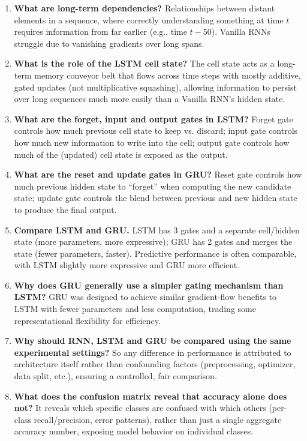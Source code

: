 \documentclass[10pt]{article}
\begin{document}
\begin{enumerate}
\item \textbf{What are long-term dependencies?}
Relationships between distant elements in a sequence, where correctly understanding something at time $t$ 
requires information from far earlier (e.g., time $t-50$). Vanilla RNNs struggle due to vanishing gradients 
over long spans.

\item \textbf{What is the role of the LSTM cell state?}
The cell state acts as a long-term memory conveyor belt that flows across time steps with mostly additive, 
gated updates (not multiplicative squashing), allowing information to persist over long sequences much more 
easily than a Vanilla RNN's hidden state.

\item \textbf{What are the forget, input and output gates in LSTM?}
Forget gate controls how much previous cell state to keep vs. discard; input gate controls how much new 
information to write into the cell; output gate controls how much of the (updated) cell state is exposed 
as the output.

\item \textbf{What are the reset and update gates in GRU?}
Reset gate controls how much previous hidden state to ``forget'' when computing the new candidate state; 
update gate controls the blend between previous and new hidden state to produce the final output.

\item \textbf{Compare LSTM and GRU.}
LSTM has 3 gates and a separate cell/hidden state (more parameters, more expressive); GRU has 2 gates and 
merges the state (fewer parameters, faster). Predictive performance is often comparable, with LSTM slightly 
more expressive and GRU more efficient.

\item \textbf{Why does GRU generally use a simpler gating mechanism than LSTM?}
GRU was designed to achieve similar gradient-flow benefits to LSTM with fewer parameters and less 
computation, trading some representational flexibility for efficiency.

\item \textbf{Why should RNN, LSTM and GRU be compared using the same experimental settings?}
So any difference in performance is attributed to architecture itself rather than confounding factors 
(preprocessing, optimizer, data split, etc.), ensuring a controlled, fair comparison.

\item \textbf{What does the confusion matrix reveal that accuracy alone does not?}
It reveals which specific classes are confused with which others (per-class recall/precision, error patterns), 
rather than just a single aggregate accuracy number, exposing model behavior on individual classes.


\end{enumerate}
\end{document}

